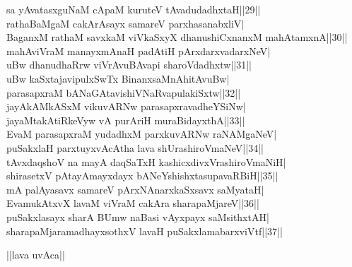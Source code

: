 \documentclass{article}
\begin{document}
sa yAvatasxguNaM cApaM kuruteV tAvadudadhxtaH||29||\\
rathaBaMgaM cakArAsayx samareV parxhasanabxliV|\\
BaganxM rathaM savxkaM viVkaSxyX dhanushiCxnanxM mahAtamxnA||30||\\
mahAviVraM manayxmAnaH padAtiH pArxdarxvadarxNeV|\\
uBw dhanudhaRrw viVrAvuBAvapi sharoVdadhxtw||31||\\
uBw kaSxtajavipulxSwTx BinanxsaMnAhitAvuBw|\\
parasapxraM bANaGAtavishiVNaRvapulakiSxtw||32||\\
jayAkAMkASxM vikuvARNw parasapxravadheYSiNw|\\
jayaMtakAtiRkeVyw vA purAriH muraBidayxthA||33||\\
EvaM parasapxraM yudadhxM parxkuvARNw raNAMgaNeV|\\
puSakxlaH parxtuyxvAcAtha lava shUrashiroVmaNeV||34||\\
tAvxdaqshoV na mayA daqSaTxH kashicxdivxVrashiroVmaNiH|\\
shirasetxV pAtayAmayxdayx bANeYshishxtasupavaRBiH||35||\\
mA palAyasavx samareV pArxNAnarxkaSxsavx saMyataH|\\
EvamukAtxvX lavaM viVraM cakAra sharapaMjareV||36||\\
puSakxlasayx sharA BUmw naBasi vAyxpayx saMsithxtAH|\\
sharapaMjaramadhayxsothxV lavaH puSakxlamabarxviVtf||37||\\

\begin{center}
||lava uvAca||
\end{center}
\end{document}
